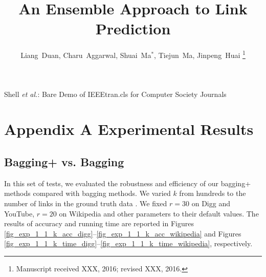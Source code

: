 \documentclass[10pt,journal,compsoc]{IEEEtran}
\newcommand{\Digg}{{\sf Digg}\xspace}
\newcommand{\YouTube}{{\sf YouTube}\xspace}
\newcommand{\Wikipedia}{{\sf Wikipedia}\xspace}
\begin{document}
\title{An Ensemble Approach to Link Prediction}

\author{Liang~Duan,
        Charu~Aggarwal,
        Shuai~Ma$^*$,
        Tiejun~Ma,
        Jinpeng~Huai
\thanks{Manuscript received XXX, 2016; revised XXX, 2016.}}


%
{Shell \MakeLowercase{\textit{et al.}}: Bare Demo of IEEEtran.cls for Computer Society Journals}


\maketitle



\section{Appendix A Experimental Results}


\subsection{Bagging+ vs. Bagging}
In this set of tests, we evaluated the robustness and efficiency of our
bagging+ methods compared with bagging methods. We varied $k$ from hundreds
to the number of links in the ground truth data \cite{yang2015}.
We fixed $r = 30$ on \Digg and \YouTube,
$r = 20$ on \Wikipedia and other parameters to their default values.
The results of accuracy and running time are reported
in Figures \ref{fig_exp_1_1_k_acc_digg}--\ref{fig_exp_1_1_k_acc_wikipedia} and
Figures \ref{fig_exp_1_1_k_time_digg}--\ref{fig_exp_1_1_k_time_wikipedia}, respectively.
\end{document}
